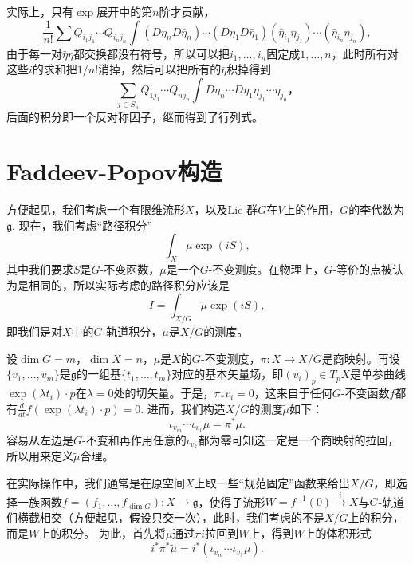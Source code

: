 \documentclass[11pt]{article}
\theoremstyle{definition}
\theoremstyle{plain}
\begin{document}
实际上，只有$\exp$展开中的第$n$阶才贡献，
\[
    \frac{1}{n!}\sum Q_{i_1j_1}\cdots Q_{i_nj_n}\int (D\eta_nD\bar\eta_n)\cdots (D\eta_1D\bar\eta_1) (\bar\eta_{i_1}\eta_{j_1})\cdots (\bar\eta_{i_n}\eta_{j_n}),
\]
由于每一对$\bar\eta\eta$都交换都没有符号，所以可以把$i_1,\dots,i_n$固定成$1,\dots,n$，此时所有对这些$i$的求和把$1/n!$消掉，然后可以把所有的$\bar\eta$积掉得到
\[
    \sum_{j\in S_n} Q_{1j_1}\cdots Q_{nj_n}\int D\eta_n\cdots D\eta_1 \eta_{j_1}\cdots \eta_{j_n}，
\]
后面的积分即一个反对称因子，继而得到了行列式。

\section{Faddeev-Popov构造}

方便起见，我们考虑一个有限维流形$X$，以及Lie 群$G$在$V$上的作用，$G$的李代数为$\mathfrak g$. 现在，我们考虑“路径积分”
\[
\int_{X} \mu \exp(iS),
\]
其中我们要求$S$是$G$-不变函数，$\mu$是一个$G$-不变测度。在物理上，$G$-等价的点被认为是相同的，所以实际考虑的路径积分应该是
\[
I=\int_{X/G}\tilde \mu\exp(iS),
\]
即我们是对$X$中的$G$-轨道积分，$\tilde \mu$是$X/G$的测度。

设$\dim G=m$，$\dim X=n$，$\mu$是$X$的$G$-不变测度，$\pi:X\to X/G$是商映射。再设$\{v_1,\dots,v_{m}\}$是$\mathfrak g$的一组基$\{t_1,\dots,t_{m}\}$对应的基本矢量场，即$(v_i)_p\in T_p X$是单参曲线$\exp(\lambda t_i)\cdot p$在$\lambda=0$处的切矢量。于是，$\pi_* v_i=0$，这来自于任何$G$-不变函数$f$都有$\frac{d}{dt}f(\exp(\lambda t_i)\cdot p)=0$. 进而，我们构造$X/G$的测度$\tilde \mu$如下：
\[
    \iota_{v_m}\cdots \iota_{v_1}\mu=\pi^*\tilde \mu.
\]
容易从左边是$G$-不变和再作用任意的$\iota_{v_k}$都为零可知这一定是一个商映射的拉回，所以用来定义$\tilde \mu$合理。

在实际操作中，我们通常是在原空间$X$上取一些“规范固定”函数来给出$X/G$，即选择一族函数$f=(f_1, \dots, f_{\dim G}):X\to \mathfrak g$，使得子流形$W=f^{-1}(0)\xrightarrow{i} X$与$G$-轨道们横截相交（方便起见，假设只交一次），此时，我们考虑的不是$X/G$上的积分，而是$W$上的积分。
为此，首先将$\tilde \mu$通过$\pi i$拉回到$W$上，得到$W$上的体积形式
\[
    i^*\pi^*\tilde \mu=i^*(\iota_{v_m}\cdots \iota_{v_1}\mu).
\]


\end{document}
